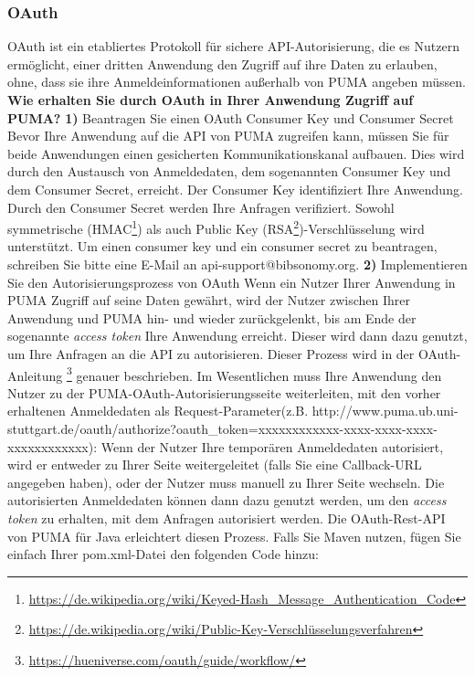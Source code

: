 \subsubsection{OAuth}
OAuth ist ein etabliertes Protokoll für sichere API-Autorisierung, die es Nutzern ermöglicht, einer dritten Anwendung den Zugriff auf ihre Daten zu erlauben, ohne, dass sie ihre Anmeldeinformationen außerhalb von PUMA angeben müssen. 
\newline
\newline
\textbf {Wie erhalten Sie durch OAuth in Ihrer Anwendung Zugriff auf PUMA?} \newline
\textbf {1)} Beantragen Sie einen OAuth Consumer Key und Consumer Secret\newline 
Bevor Ihre Anwendung auf die API von PUMA zugreifen kann, müssen Sie für beide Anwendungen einen gesicherten Kommunikationskanal aufbauen. Dies wird durch den Austausch von Anmeldedaten, dem sogenannten Consumer Key und dem Consumer Secret, erreicht. Der Consumer Key identifiziert Ihre Anwendung. Durch den Consumer Secret werden Ihre Anfragen verifiziert. Sowohl symmetrische (HMAC\footnote{\url{https://de.wikipedia.org/wiki/Keyed-Hash_Message_Authentication_Code}}) als auch Public Key (RSA\footnote{\url{https://de.wikipedia.org/wiki/Public-Key-Verschlüsselungsverfahren}})-Verschlüsselung wird unterstützt.
Um einen consumer key und ein consumer secret zu beantragen, schreiben Sie bitte eine E-Mail an api-support@bibsonomy.org. \newline
\newline
\textbf{2)} Implementieren Sie den Autorisierungsprozess von OAuth\newline
Wenn ein Nutzer Ihrer Anwendung in PUMA Zugriff auf seine Daten gewährt, wird der Nutzer zwischen Ihrer Anwendung und PUMA hin- und wieder zurückgelenkt, bis am Ende der sogenannte \textit{access token} Ihre Anwendung erreicht. Dieser wird dann dazu genutzt, um Ihre Anfragen an die API zu autorisieren. Dieser Prozess wird in der OAuth-Anleitung \footnote{\url{https://hueniverse.com/oauth/guide/workflow/}} genauer beschrieben.\newline
Im Wesentlichen muss Ihre Anwendung den Nutzer zu der PUMA-OAuth-Autorisierungsseite weiterleiten, mit den vorher erhaltenen Anmeldedaten als Request-Parameter\newline (z.B. http://www.puma.ub.uni-stuttgart.de/oauth/authorize?oauth\_token=xxxxxxxxxxxx-xxxx-xxxx-xxxx-xxxxxxxxxxxx): %
\newline
\newline
Wenn der Nutzer Ihre temporären Anmeldedaten autorisiert, wird er entweder zu Ihrer Seite weitergeleitet (falls Sie eine Callback-URL angegeben haben), oder der Nutzer muss manuell zu Ihrer Seite wechseln. Die autorisierten Anmeldedaten können dann dazu genutzt werden, um den \textit{access token} zu erhalten, mit dem Anfragen autorisiert werden.
\newline
\newline
Die OAuth-Rest-API von PUMA für Java erleichtert diesen Prozess. Falls Sie Maven nutzen, fügen Sie einfach Ihrer pom.xml-Datei den folgenden Code hinzu:

